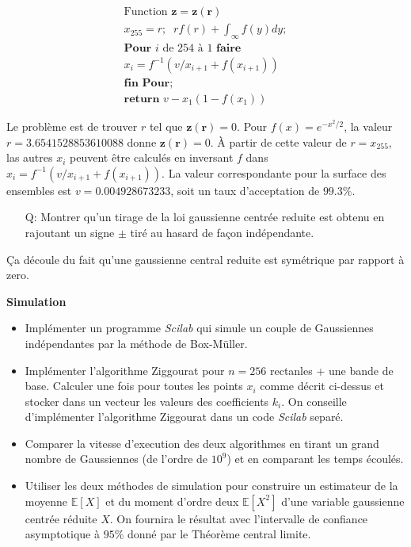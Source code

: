 \documentclass[a4paper]{article}
\begin{document}
\begin{align*}
\text{Function }\mathbf{z = z(r)}\\
x_{255} = r;\;\;rf(r)+\int_{\infty}f(y)dy;\\
\textbf{Pour }i \text{ de } 254 \text{ \`a } 1 \textbf{ faire}\\
x_i = f^{-1}(v/x_{i+1}+f(x_{i+1}))\\
\textbf{fin Pour;}\\
\textbf{return }v-x_1(1-f(x_1))
\end{align*}

Le probl\`eme est de trouver $r$ tel que $\mathbf{z(r)} = 0$. Pour $f(x) = e^{-x^2/2}$, la valeur $r=3.6541528853610088$ donne $\mathbf{z(r)} = 0$. \`A partir de cette valeur de $r = x_{255}$, las autres $x_i$ peuvent \^etre calcul\'es en inversant $f$ dans $x_i = f^{-1}(v/x_{i+1}+f(x_{i+1}))$. La valeur correspondante pour la surface des ensembles est $v = 0.004928673233$, soit un taux d'acceptation de $99.3\%$.
\begin{itemize}
\item[Q:] Montrer qu'un tirage de la loi gaussienne centr\'ee reduite est obtenu en rajoutant un signe $\pm$ tir\'e au hasard de fa\c{c}on ind\'ependante.
\end{itemize}

\c{C}a découle du fait qu'une gaussienne central reduite est sym\'etrique par rapport \`a zero.

\textbf{Simulation}
\begin{itemize}
\item Impl\'ementer un programme \emph{Scilab} qui simule un couple de Gaussiennes ind\'ependantes par la m\'ethode de Box-M\"uller.
\item Impl\'ementer l'algorithme Ziggourat pour $n=256$ rectanles + une bande de base. Calculer une fois pour toutes les points $x_i$ comme d\'ecrit ci-dessus et stocker dans un vecteur les valeurs des coefficients $k_i$. On conseille d'impl\'ementer l'algorithme Ziggourat dans un code \emph{Scilab} separ\'e.
\item Comparer la vitesse d'execution des deux algorithmes en tirant un grand nombre de Gaussiennes (de l'ordre de $10^9$) et en comparant les temps \'ecoul\'es.
\item Utiliser les deux m\'ethodes de simulation pour construire un estimateur de la moyenne $\mathbb{E}[X]$ et du moment d'ordre deux $\mathbb{E}[X^2]$ d'une variable gaussienne centr\'ee r\'eduite $X$. On fournira le r\'esultat avec l'intervalle de confiance asymptotique \`a $95\%$ donn\'e par le Th\'eor\`eme central limite.
\end{itemize}
\end{document}
